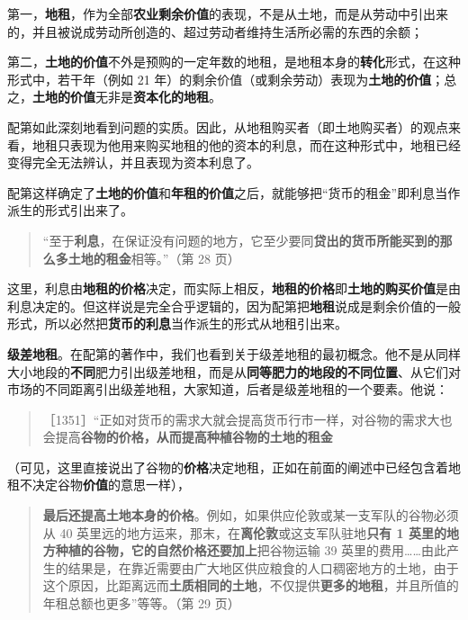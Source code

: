 第一，\textbf{地租}，作为全部\textbf{农业剩余价值}的表现，不是从土地，而是从劳动中引出来的，并且被说成劳动所创造的、超过劳动者维持生活所必需的东西的余额；

第二，\textbf{土地的价值}不外是预购的一定年数的地租，是地租本身的\textbf{转化}形式，在这种形式中，若干年（例如 21 年）的剩余价值（或剩余劳动）表现为\textbf{土地的价值}；总之，\textbf{土地的价值}无非是\textbf{资本化的地租}。

配第如此深刻地看到问题的实质。因此，从地租购买者（即土地购买者）的观点来看，地租只表现为他用来购买地租的他的资本的利息，而在这种形式中，地租已经变得完全无法辨认，并且表现为资本利息了。

配第这样确定了\textbf{土地的价值}和\textbf{年租的价值}之后，就能够把“货币的租金”即利息当作派生的形式引出来了。

\begin{quote}“至于\textbf{利息}，在保证没有问题的地方，它至少要同\textbf{贷出的货币所能买到的那么多土地的租金}相等。”（第 28 页）\end{quote}

这里，利息由\textbf{地租的价格}决定，而实际上相反，\textbf{地租的价格}即\textbf{土地的购买价值}是由利息决定的。但这样说是完全合乎逻辑的，因为配第把\textbf{地租}说成是剩余价值的一般形式，所以必然把\textbf{货币的利息}当作派生的形式从地租引出来。

\textbf{级差地租}。在配第的著作中，我们也看到关于级差地租的最初概念。他不是从同样大小地段的\textbf{不同}肥力引出级差地租，而是从\textbf{同等肥力的地段的不同位置}、从它们对市场的不同距离引出级差地租，大家知道，后者是级差地租的一个要素。他说：

\begin{quote}［1351］“正如对货币的需求大就会提高货币行市一样，对谷物的需求大也会提高\textbf{谷物的价格，从而提高种植谷物的土地的租金}\end{quote}

（可见，这里直接说出了谷物的\textbf{价格}决定地租，正如在前面的阐述中已经包含着地租不决定谷物\textbf{价值}的意思一样），

\begin{quote}\textbf{最后还提高土地本身的价格}。例如，如果供应伦敦或某一支军队的谷物必须从 40 英里远的地方运来，那末，在\textbf{离伦敦}或这支军队驻地\textbf{只有 1 英里的地方种植的谷物，它的自然价格还要加上}把谷物运输 39 英里的费用……由此产生的结果是，在靠近需要由广大地区供应粮食的人口稠密地方的土地，由于这个原因，比距离远而\textbf{土质相同的土地}，不仅提供\textbf{更多的地租}，并且所值的年租总额也更多”等等。（第 29 页）\end{quote}

